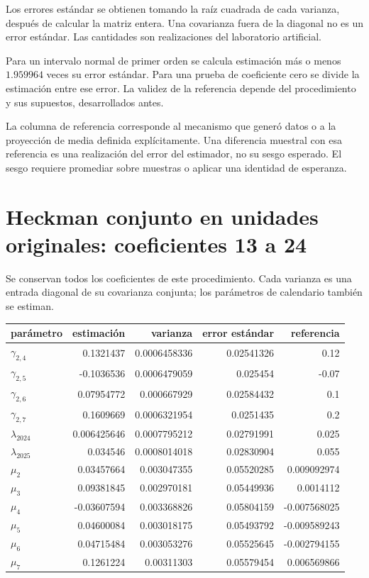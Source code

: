 \documentclass[11pt,a4paper]{article}
\begin{document}
Los errores estándar se obtienen tomando la raíz cuadrada de cada varianza, después de calcular la matriz entera. Una covarianza fuera de la diagonal no es un error estándar. Las cantidades son realizaciones del laboratorio artificial.

Para un intervalo normal de primer orden se calcula estimación más o menos $1.959964$ veces su error estándar. Para una prueba de coeficiente cero se divide la estimación entre ese error. La validez de la referencia depende del procedimiento y sus supuestos, desarrollados antes.

La columna de referencia corresponde al mecanismo que generó datos o a la proyección de media definida explícitamente. Una diferencia muestral con esa referencia es una realización del error del estimador, no su sesgo esperado. El sesgo requiere promediar sobre muestras o aplicar una identidad de esperanza.

\clearpage
\section{Heckman conjunto en unidades originales: coeficientes 13 a 24}
Se conservan todos los coeficientes de este procedimiento. Cada varianza es una entrada diagonal de su covarianza conjunta; los parámetros de calendario también se estiman.
\begin{center}\small
\begin{tabular}{lrrrr}
\toprule
parámetro & estimación & varianza & error estándar & referencia\\\midrule
$\gamma_{2,4}$ & 0.1321437 & 0.0006458336 & 0.02541326 & 0.12\\
$\gamma_{2,5}$ & -0.1036536 & 0.0006479059 & 0.025454 & -0.07\\
$\gamma_{2,6}$ & 0.07954772 & 0.000667929 & 0.02584432 & 0.1\\
$\gamma_{2,7}$ & 0.1609669 & 0.0006321954 & 0.0251435 & 0.2\\
$\lambda_{2024}$ & 0.006425646 & 0.0007795212 & 0.02791991 & 0.025\\
$\lambda_{2025}$ & 0.034546 & 0.0008014018 & 0.02830904 & 0.055\\
$\mu_2$ & 0.03457664 & 0.003047355 & 0.05520285 & 0.009092974\\
$\mu_3$ & 0.09381845 & 0.002970181 & 0.05449936 & 0.0014112\\
$\mu_4$ & -0.03607594 & 0.003368826 & 0.05804159 & -0.007568025\\
$\mu_5$ & 0.04600084 & 0.003018175 & 0.05493792 & -0.009589243\\
$\mu_6$ & 0.04715484 & 0.003053276 & 0.05525645 & -0.002794155\\
$\mu_7$ & 0.1261224 & 0.00311303 & 0.05579454 & 0.006569866\\
\bottomrule
\end{tabular}\end{center}
\end{document}
